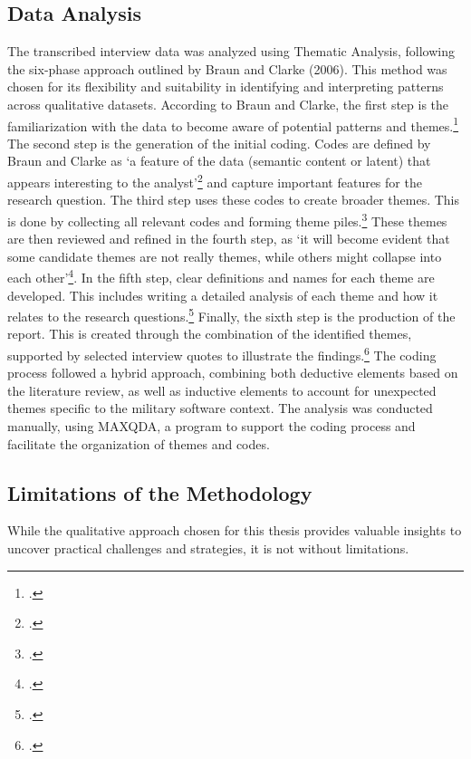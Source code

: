 \subsection{Data Analysis}
The transcribed interview data was analyzed using Thematic Analysis, following the six-phase approach outlined by Braun and Clarke (2006). This method was chosen for its flexibility and suitability in identifying and interpreting patterns across qualitative datasets.
According to Braun and Clarke, the first step is the familiarization with the data to become aware of potential patterns and themes.\footcite[16]{braunUsingThematicAnalysis2006} The second step is the generation of the initial coding. Codes are defined by Braun and Clarke as
`a feature of the data  (semantic content or latent) that appears interesting to the analyst'\footcite[18]{braunUsingThematicAnalysis2006} and capture important features for the research question. The third step uses these codes to create broader themes. This is done 
by collecting all relevant codes and forming theme piles.\footcite[19-20]{braunUsingThematicAnalysis2006} These themes are then reviewed and refined in the fourth step, as `it will become evident that some candidate themes are not really  themes, while  others might collapse into each other'\footcite[20]{braunUsingThematicAnalysis2006}.
In the fifth step, clear definitions and names for each theme are developed. This includes writing a detailed analysis of each theme and how it relates to the research questions.\footcite[22]{braunUsingThematicAnalysis2006} 
Finally, the sixth step is the production of the report. This is created through the combination of the identified themes, supported by selected interview quotes to illustrate the findings.\footcite[23]{braunUsingThematicAnalysis2006}
The coding process followed a hybrid approach, combining both deductive elements based on the literature review, as well as inductive elements to account for unexpected themes specific to the military software context. The analysis was conducted manually, using MAXQDA, a program to support the coding process and facilitate the organization of themes and codes.

\subsection{Limitations of the Methodology}
While the qualitative approach chosen for this thesis provides valuable insights to uncover practical challenges and strategies, it is not without limitations.

